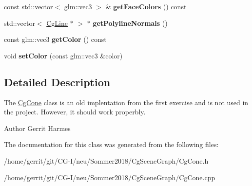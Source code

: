 \begin{DoxyCompactItemize}
const std\+::vector$<$ glm\+::vec3 $>$ \& {\bfseries get\+Face\+Colors} () const
\item 
\mbox{\label{class_cg_cone_a0eb2bae9651d9b55d4862d275ece80cb}} 
std\+::vector$<$ \hyperlink{class_cg_line}{Cg\+Line} $\ast$ $>$ $\ast$ {\bfseries get\+Polyline\+Normals} ()
\item 
\mbox{\label{class_cg_cone_a09005ea5f01652c63c69871073d349cf}} 
const glm\+::vec3 {\bfseries get\+Color} () const
\item 
\mbox{\label{class_cg_cone_a4fb55cbfe74051de4944b136d71777d0}} 
void {\bfseries set\+Color} (const glm\+::vec3 \&color)
\end{DoxyCompactItemize}


\subsection{Detailed Description}
The \hyperlink{class_cg_cone}{Cg\+Cone} class is an old implentation from the first exercise and is not used in the project. However, it should work properbly. 

\begin{DoxyAuthor}{Author}
Gerrit Harmes 
\end{DoxyAuthor}


The documentation for this class was generated from the following files\+:\begin{DoxyCompactItemize}
\item 
/home/gerrit/git/\+C\+G-\/\+I/neu/\+Sommer2018/\+Cg\+Scene\+Graph/Cg\+Cone.\+h\item 
/home/gerrit/git/\+C\+G-\/\+I/neu/\+Sommer2018/\+Cg\+Scene\+Graph/Cg\+Cone.\+cpp\end{DoxyCompactItemize}
